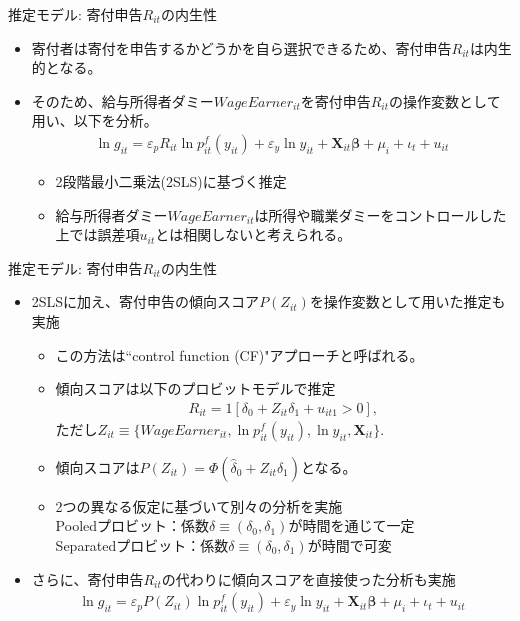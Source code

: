 \documentclass[dvipdfmx,10pt]{beamer}
\begin{document}
\begin{frame}{推定モデル: 寄付申告$R_{it}$の内生性}
	\begin{itemize}
		\item 寄付者は寄付を申告するかどうかを自ら選択できるため、寄付申告$R_{it}$は内生的となる。
		\item そのため、給与所得者ダミー$WageEarner_{it}$を寄付申告$R_{it}$の操作変数として用い、以下を分析。
		\begin{align}
			\ln g_{it} = \varepsilon_pR_{it} \ln p_{it}^f(y_{it}) + \varepsilon_y \ln y_{it} + \bm{X}_{it}\bm{\beta} + \mu_i + \iota_t + u_{it}\tag{7}
		\end{align} 
	 	\begin{itemize}
	 		\item 2段階最小二乗法(2SLS)に基づく推定
			\item 給与所得者ダミー$WageEarner_{it}$は所得や職業ダミーをコントロールした上では誤差項$u_{it}$とは相関しないと考えられる。
		\end{itemize}
	\end{itemize}
\end{frame}

\begin{frame}{推定モデル: 寄付申告$R_{it}$の内生性}
	\begin{itemize}
		\item 2SLSに加え、寄付申告の傾向スコア$P(Z_{it})$を操作変数として用いた推定も実施
		\begin{itemize}
			\item この方法は``control function (CF)"アプローチと呼ばれる。
			\item 傾向スコアは以下のプロビットモデルで推定
			\begin{align}
				R_{it}=1[\delta_0+Z_{it}\delta_1+u_{it1}>0]\tag{8},
			\end{align}
			ただし$Z_{it}\equiv \{WageEarner_{it}, \ln p_{it}^f(y_{it}), \ln y_{it}, \bm{X}_{it}\}$.
			\item 傾向スコアは$P(Z_{it})=\Phi(\hat{\delta}_0+Z_{it}\hat{\delta}_1)$となる。
			\item 2つの異なる仮定に基づいて別々の分析を実施\\
			  Pooledプロビット：係数$\delta\equiv (\delta_0, \delta_1)$が時間を通じて一定\\
			  Separatedプロビット：係数$\delta\equiv (\delta_0, \delta_1)$が時間で可変
		\end{itemize}
		\item さらに、寄付申告$R_{it}$の代わりに傾向スコアを直接使った分析も実施
		\begin{align}
			\ln g_{it} = \varepsilon_pP(Z_{it})\ln p_{it}^f(y_{it}) + \varepsilon_y \ln y_{it} + \bm{X}_{it}\bm{\beta} + \mu_i + \iota_t + u_{it}\tag{9}
		\end{align}
	\end{itemize}
\end{frame}
\end{document}
